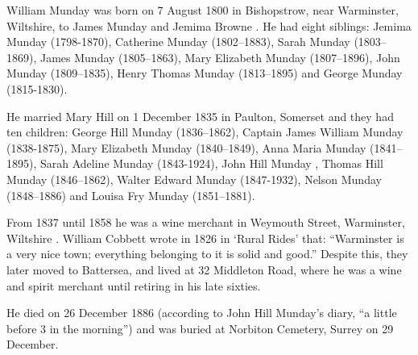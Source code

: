 
William Munday was born on 7 August 1800 \cite{WillMundayBirth} in Bishopstrow, near Warminster, Wiltshire, to James Munday  and Jemima Browne .  He had eight siblings:  Jemima Munday (1798-1870), Catherine Munday (1802--1883), Sarah Munday (1803--1869), James Munday (1805--1863), Mary Elizabeth Munday (1807--1896), John Munday (1809--1835), Henry Thomas Munday (1813--1895) and George Munday (1815-1830).

He married Mary Hill  on 1 December 1835 in Paulton, Somerset and they had ten children:  George Hill Munday (1836--1862), Captain James William Munday (1838-1875), Mary Elizabeth Munday (1840--1849), Anna Maria Munday (1841--1895), Sarah Adeline Munday (1843-1924), John Hill Munday , Thomas Hill Munday (1846--1862), Walter Edward Munday (1847-1932), Nelson Munday (1848--1886) and Louisa Fry Munday (1851--1881).

From 1837 until 1858 he was a wine merchant in Weymouth Street, Warminster, Wiltshire \cite{WillMundayOccupation}. William Cobbett wrote in 1826 in `Rural Rides' that: ``Warminster is a very nice town; everything belonging to it is solid and good.'' Despite this, they later moved to Battersea, and lived at 32 Middleton Road, where he was a wine and spirit merchant until retiring in his late sixties.\cite{WillMundayBattersea}

He died on 26 December 1886 (according to John Hill Munday's diary, ``a little before 3 in the morning'') and was buried at Norbiton Cemetery, Surrey on 29 December.\cite{WillMundayDeath}
